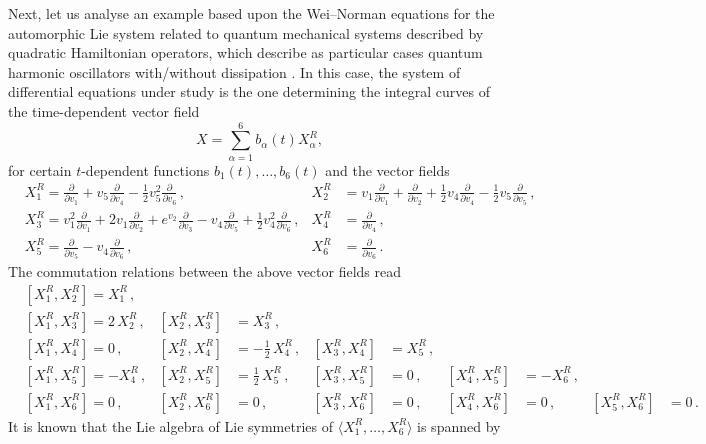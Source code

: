 \documentclass[11pt]{article}
\theoremstyle{plain}
\theoremstyle{definition}
\numberwithin{equation}{section}
\begin{document}
Next, let us analyse an example based upon the Wei--Norman equations for the automorphic Lie system related to quantum mechanical systems described by  quadratic Hamiltonian operators, which describe as particular cases quantum harmonic oscillators with/without dissipation \cite{CL_11,WN_63}. In this case, the system of differential equations under study is the one determining the integral curves of the time-dependent vector field
\begin{equation}\label{eq:CoeAutSys}
X=\sum_{\alpha=1}^6b_\alpha(t)X_\alpha^R,
\end{equation}
for certain $t$-dependent functions $b_1(t),\ldots,b_6(t)$ and the vector fields
\begin{equation}\label{Eq:Rel}
\begin{aligned}
&X^R_1=\frac{\partial}{\partial v_1}+v_5\frac{\partial }{\partial v_4}-\frac{1}{2}v_5^2\frac{\partial }{\partial v_6}\,,
&X^R_2&=v_1\frac{\partial}{\partial v_1}+\frac{\partial }{\partial v_2}+\frac{1}{2}v_4\frac{\partial }{\partial v_4}-\frac{1}{2}v_5\frac{\partial }{\partial v_5}\,,\\
&X^R_3=v_1^2\frac{\partial }{\partial v_1}+2v_1\frac{\partial }{\partial v_2}+e^{v_2}\frac{\partial }{\partial v_3}-v_4\frac{\partial }{\partial v_5}+\frac{1}{2}v_4^2\frac{\partial }{\partial v_6}\,,
&X^R_4&=\frac{\partial }{\partial v_4}\,,
\\
&X^R_5=\frac{\partial }{\partial v_5}-v_4\frac{\partial }{\partial v_6}\,,
&X^R_6&=\frac{\partial }{\partial v_6}\,.
\end{aligned}
\end{equation}
The commutation relations between the above vector fields read
{\small
\begin{equation}
\begin{aligned}
&[X^R_1,X^R_2]=X^R_1\,, &&&&&&&&
\\
&[X^R_1,X^R_3]=2\, X^R_2\,,
&[X^R_2,X^R_3]&=X^R_3\,,
&& && &&
\\
&[X^R_1,X^R_4]=0\,,
&[X^R_2,X^R_4]&=-\frac 12\, X^R_4\,,
&[X^R_3,X^R_4]&=X^R_5\,,
&& &&
\\
&[X^R_1,X^R_5]=-X^R_4\,,
&[X^R_2,X^R_5]&=\frac 12\, X^R_5\,,
&[X^R_3,X^R_5]&=0\,,
&[X^R_4,X^R_5]&=-X^R_6\,,
&&
\\
&[X^R_1,X^R_6]=0\,,
&[X^R_2,X^R_6]&=0\,,
&[X^R_3,X^R_6]&=0\,,
&[X^R_4,X^R_6]&=0\,,
&[X^R_5,X^R_6]&=0\,.
\end{aligned}
\end{equation}
}
It is known that the Lie algebra of Lie symmetries of $\langle X^R_1,\ldots,X_6^R\rangle$  is spanned by
\end{document}
